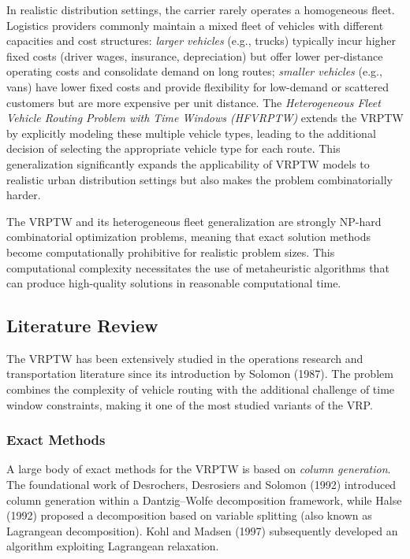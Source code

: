 \documentclass[11pt]{article}
\begin{document}
In realistic distribution settings, the carrier rarely operates a homogeneous fleet. Logistics providers commonly maintain a mixed fleet of vehicles with different capacities and cost structures: \emph{larger vehicles} (e.g., trucks) typically incur higher fixed costs (driver wages, insurance, depreciation) but offer lower per-distance operating costs and consolidate demand on long routes; \emph{smaller vehicles} (e.g., vans) have lower fixed costs and provide flexibility for low-demand or scattered customers but are more expensive per unit distance. The \emph{Heterogeneous Fleet Vehicle Routing Problem with Time Windows (HFVRPTW)} extends the VRPTW by explicitly modeling these multiple vehicle types, leading to the additional decision of selecting the appropriate vehicle type for each route. This generalization significantly expands the applicability of VRPTW models to realistic urban distribution settings but also makes the problem combinatorially harder.

The VRPTW and its heterogeneous fleet generalization are strongly NP-hard combinatorial optimization problems, meaning that exact solution methods become computationally prohibitive for realistic problem sizes. This computational complexity necessitates the use of metaheuristic algorithms that can produce high-quality solutions in reasonable computational time.

\subsection{Literature Review}

The VRPTW has been extensively studied in the operations research and transportation literature since its introduction by Solomon (1987). The problem combines the complexity of vehicle routing with the additional challenge of time window constraints, making it one of the most studied variants of the VRP.

\subsubsection{Exact Methods}

A large body of exact methods for the VRPTW is based on \emph{column generation}. The foundational work of Desrochers, Desrosiers and Solomon (1992) introduced column generation within a Dantzig--Wolfe decomposition framework, while Halse (1992) proposed a decomposition based on variable splitting (also known as Lagrangean decomposition). Kohl and Madsen (1997) subsequently developed an algorithm exploiting Lagrangean relaxation.
\end{document}
